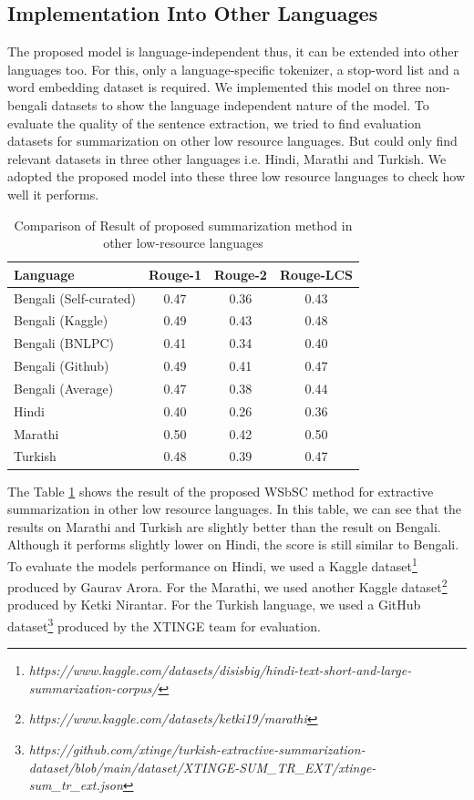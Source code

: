 \documentclass[acmlarge]{acmart}
\begin{document}
\subsection{Implementation Into Other Languages}\label{subsec:implementation-into-other-languages}
The proposed model is language-independent thus, it can be extended into other languages too. For this, only a language-specific tokenizer, a stop-word list and a word embedding dataset is required. We implemented this model on three non-bengali datasets to show the language independent nature of the model. To evaluate the quality of the sentence extraction, we tried to find evaluation datasets for summarization on other low resource languages. But could only find relevant datasets in three other languages i.e. Hindi, Marathi and Turkish. We adopted the proposed model into these three low resource languages to check how well it performs.
\begin{table}[]
	\centering
	\begin{tabular}{lccc}\hline
		Language              	& Rouge-1   & Rouge-2   & Rouge-LCS \\\hline
		Bengali (Self-curated)	& 0.47      & 0.36      & 0.43      \\
		Bengali (Kaggle)   		& 0.49      & 0.43      & 0.48      \\
		Bengali (BNLPC)   		& 0.41      & 0.34      & 0.40      \\
		Bengali (Github)   		& 0.49      & 0.41      & 0.47      \\
		Bengali (Average)       & 0.47      & 0.38      & 0.44      \\\hline
		Hindi                   & 0.40      & 0.26      & 0.36      \\\hline
		Marathi                 & 0.50	    & 0.42      & 0.50      \\\hline
		Turkish                 & 0.48      & 0.39      & 0.47      \\\hline
	\end{tabular}
	\caption{Comparison of Result of proposed summarization method in other low-resource languages}
	\label{tab:other_language}
\end{table}
The Table \ref{tab:other_language} shows the result of the proposed WSbSC method for extractive summarization in other low resource languages. In this table, we can see that the results on Marathi and Turkish are slightly better than the result on Bengali. Although it performs slightly lower on Hindi, the score is still similar to Bengali. To evaluate the models performance on Hindi, we used a Kaggle dataset\footnote{\textit{https://www.kaggle.com/datasets/disisbig/hindi-text-short-and-large-summarization-corpus/}} produced by Gaurav Arora. For the Marathi, we used another Kaggle dataset\footnote{\textit{https://www.kaggle.com/datasets/ketki19/marathi}} produced by Ketki Nirantar. For the Turkish language, we used a GitHub dataset\footnote{\textit{https://github.com/xtinge/turkish-extractive-summarization-dataset/blob/main/dataset/XTINGE-SUM\_TR\_EXT/xtinge-sum\_tr\_ext.json}} produced by the XTINGE \cite{Demir-2024-xtinge_turkish_extractive} team for evaluation. 
\end{document}
